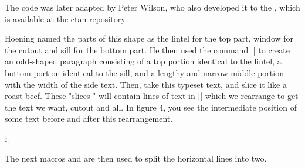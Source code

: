 The code was later adapted by Peter Wilson, who also developed it to the , which is available at the ctan repository.

Hoening named the parts of this shape as the lintel for the top part, window for the cutout and sill for the bottom part. He then used the command |\parshape| to create an odd-shaped paragraph consisting of a top portion identical to the lintel, a bottom portion identical to the sill, and a lengthy and narrow middle portion with the width of the side text. Then, take this typeset text, and slice it like a roast beef. These "slices " will contain lines of text in |\vboxes| which we rearrange to get the text we want, cutout and all. In figure 4, you see the intermediate position of some text before and after this rearrangement. 

\begin{teX}%
\newcount\l 
\newcount\d 
\newdimen\lftside 
\newdimen\rtside 
\newtoks\a
\newbox\rawtext 
\newbox\holder 
\newbox\window 
\newcount\n
\newbox\finaltext 
\newbox\aslice 
\newbox\bslice
\newdimen\topheight
\newdimen\ilg %
\end{teX}

%
The next macros  and  are then used
to split the horizontal lines into two.



